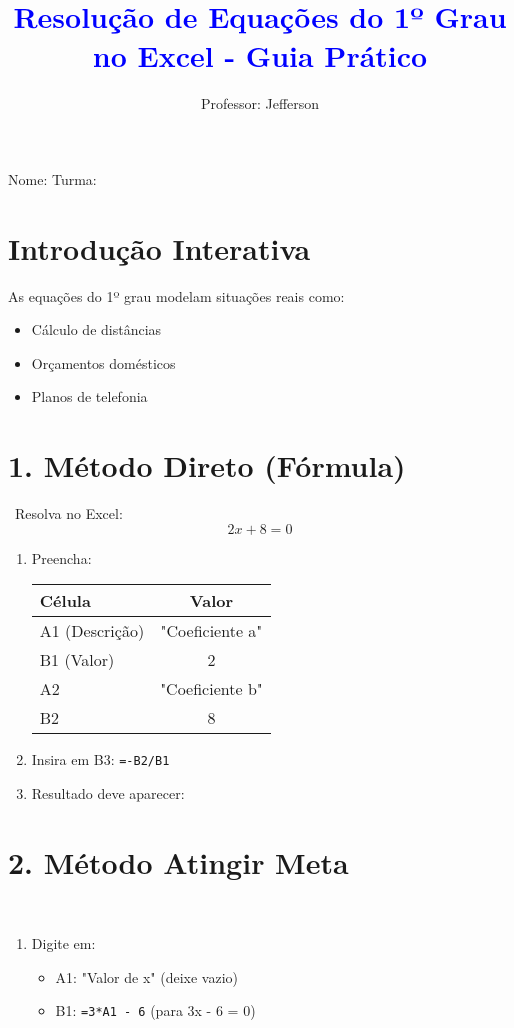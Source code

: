 \documentclass[11pt]{article}
\title{\textcolor{blue}{Resolução de Equações do 1º Grau no Excel - Guia Prático}}
\author{Professor: Jefferson}
\date{}
\begin{document}
\maketitle
\vspace{-1cm}

\begin{center}
\large{Nome: \underline{\hspace{8cm}} \quad Turma: \underline{\hspace{3cm}}}
\end{center}

\begin{multicols}{2}

\section*{Introdução Interativa}
As equações do 1º grau modelam situações reais como:
\begin{itemize}
    \item Cálculo de distâncias
    \item Orçamentos domésticos
    \item Planos de telefonia
\end{itemize}

\section*{1. Método Direto (Fórmula)}
\
Resolva no Excel:
\[ 2x + 8 = 0 \]

\begin{enumerate}
    \item Preencha:

    \begin{tabular}{|l|c|}
    \hline
    \textbf{Célula} & \textbf{Valor} \\ \hline
    A1 (Descrição) & "Coeficiente a" \\ \hline
    B1 (Valor) & 2 \\ \hline
    A2 & "Coeficiente b" \\ \hline
    B2 & 8 \\ \hline
    \end{tabular}
    
    \item Insira em B3: \texttt{=-B2/B1}
    \item Resultado deve aparecer: 
\end{enumerate}

\section*{2. Método Atingir Meta}
\
\begin{enumerate}
    \item Digite em:
    \begin{itemize}
        \item A1: "Valor de x" (deixe vazio)
        \item B1: \texttt{=3*A1 - 6} (para 3x - 6 = 0)
    \end{itemize}
    

\end{enumerate}
\end{multicols}
\end{document}
